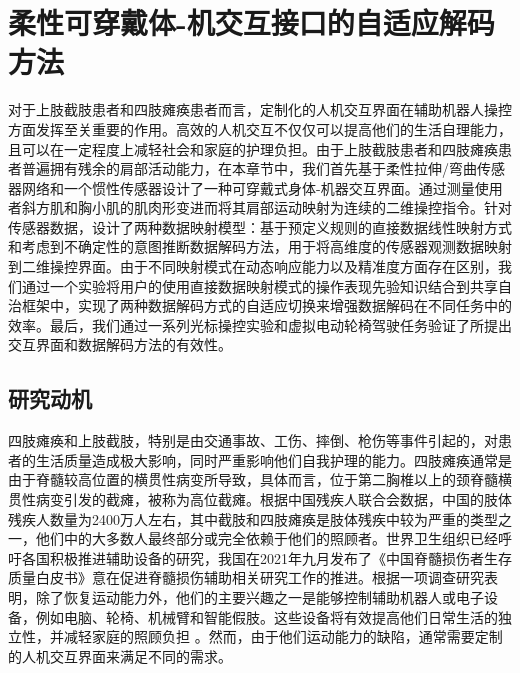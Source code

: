 \chapter{柔性可穿戴体-机交互接口的自适应解码方法}

对于上肢截肢患者和四肢瘫痪患者而言，定制化的人机交互界面在辅助机器人操控方面发挥至关重要的作用。高效的人机交互不仅仅可以提高他们的生活自理能力，且可以在一定程度上减轻社会和家庭的护理负担。由于上肢截肢患者和四肢瘫痪患者普遍拥有残余的肩部活动能力，在本章节中，我们首先基于柔性拉伸/弯曲传感器网络和一个惯性传感器设计了一种可穿戴式身体-机器交互界面。通过测量使用者斜方肌和胸小肌的肌肉形变进而将其肩部运动映射为连续的二维操控指令。针对传感器数据，设计了两种数据映射模型：基于预定义规则的直接数据线性映射方式和考虑到不确定性的意图推断数据解码方法，用于将高维度的传感器观测数据映射到二维操控界面。由于不同映射模式在动态响应能力以及精准度方面存在区别，我们通过一个实验将用户的使用直接数据映射模式的操作表现先验知识结合到共享自治框架中，实现了两种数据解码方式的自适应切换来增强数据解码在不同任务中的效率。最后，我们通过一系列光标操控实验和虚拟电动轮椅驾驶任务验证了所提出交互界面和数据解码方法的有效性。
\section{研究动机}    
四肢瘫痪和上肢截肢，特别是由交通事故、工伤、摔倒、枪伤等事件引起的，对患者的生活质量造成极大影响，同时严重影响他们自我护理的能力。四肢瘫痪通常是由于脊髓较高位置的横贯性病变所导致，具体而言，位于第二胸椎以上的颈脊髓横贯性病变引发的截瘫，被称为高位截瘫。根据中国残疾人联合会数据，中国的肢体残疾人数量为2400万人左右，其中截肢和四肢瘫痪是肢体残疾中较为严重的类型之一，他们中的大多数人最终部分或完全依赖于他们的照顾者\cite{vitorinodinizRachimeduralTraumaEpidemiology2016}。世界卫生组织已经呼吁各国积极推进辅助设备的研究，我国在2021年九月发布了《中国脊髓损伤者生存质量白皮书》意在促进脊髓损伤辅助相关研究工作的推进。根据一项调查研究表明，除了恢复运动能力外，他们的主要兴趣之一是能够控制辅助机器人或电子设备，例如电脑、轮椅、机械臂和智能假肢。这些设备将有效提高他们日常生活的独立性，并减轻家庭的照顾负担    \cite{orejuela-zapataSelfHelpDevicesQuadriplegic2019}。然而，由于他们运动能力的缺陷，通常需要定制的人机交互界面来满足不同的需求。  

